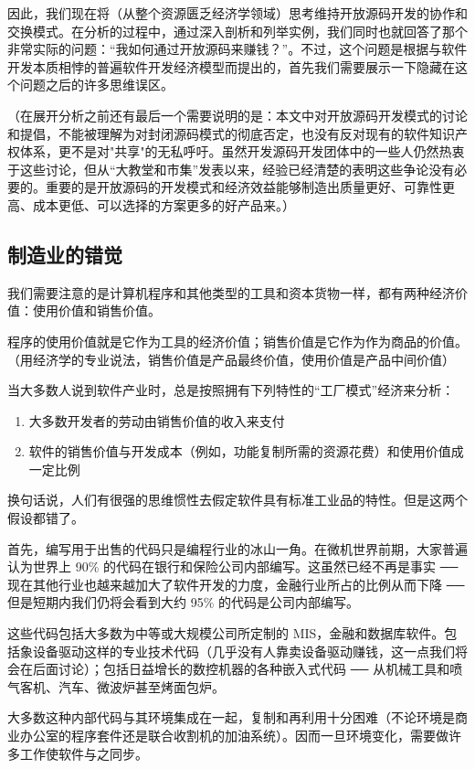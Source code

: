 因此，我们现在将（从整个资源匮乏经济学领域）思考维持开放源码开发的协作和交换模式。在分析的过程中，通过深入剖析和列举实例，我们同时也就回答了那个非常实际的问题：“我如何通过开放源码来赚钱？”。不过，这个问题是根据与软件开发本质相悖的普遍软件开发经济模型而提出的，首先我们需要展示一下隐藏在这个问题之后的许多思维误区。


（在展开分析之前还有最后一个需要说明的是：本文中对开放源码开发模式的讨论和提倡，不能被理解为对封闭源码模式的彻底否定，也没有反对现有的软件知识产权体系，更不是对"共享"的无私呼吁。虽然开发源码开发团体中的一些人仍然热衷于这些讨论，但从“大教堂和市集”发表以来，经验已经清楚的表明这些争论没有必要的。重要的是开放源码的开发模式和经济效益能够制造出质量更好、可靠性更高、成本更低、可以选择的方案更多的好产品来。）


\subsection{制造业的错觉}
我们需要注意的是计算机程序和其他类型的工具和资本货物一样，都有两种经济价值：使用价值和销售价值。


程序的使用价值就是它作为工具的经济价值；销售价值是它作为作为商品的价值。（用经济学的专业说法，销售价值是产品最终价值，使用价值是产品中间价值）

当大多数人说到软件产业时，总是按照拥有下列特性的“工厂模式”经济来分析：

\begin{enumerate}
\item 大多数开发者的劳动由销售价值的收入来支付
\item 软件的销售价值与开发成本（例如，功能复制所需的资源花费）和使用价值成一定比例
\end{enumerate}


换句话说，人们有很强的思维惯性去假定软件具有标准工业品的特性。但是这两个假设都错了。


首先，编写用于出售的代码只是编程行业的冰山一角。在微机世界前期，大家普遍认为世界上 90\% 的代码在银行和保险公司内部编写。这虽然已经不再是事实  ── 现在其他行业也越来越加大了软件开发的力度，金融行业所占的比例从而下降 ── 但是短期内我们仍将会看到大约 95\% 的代码是公司内部编写。


这些代码包括大多数为中等或大规模公司所定制的 MIS，金融和数据库软件。包括象设备驱动这样的专业技术代码（几乎没有人靠卖设备驱动赚钱，这一点我们将会在后面讨论）；包括日益增长的数控机器的各种嵌入式代码 ── 从机械工具和喷气客机、汽车、微波炉甚至烤面包炉。


大多数这种内部代码与其环境集成在一起，复制和再利用十分困难（不论环境是商业办公室的程序套件还是联合收割机的加油系统）。因而一旦环境变化，需要做许多工作使软件与之同步。


